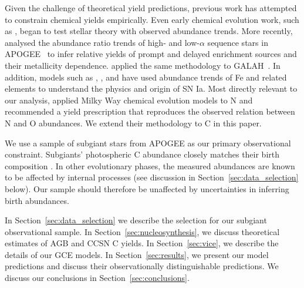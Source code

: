 \documentclass[fleqn,
usenatbib]{mnras}
\begin{document}
Given the challenge of theoretical yield predictions, previous work has attempted to constrain chemical yields empirically. 
Even early chemical evolution work, such as \citet{garnett1997}, began to test stellar theory with observed abundance trends.
More recently, \citet{weinberg+19, weinberg+22} analysed the abundance ratio trends of high- and low-$\alpha$ sequence stars in APOGEE~\citep{apogee17} to infer relative yields of prompt and delayed enrichment sources and their metallicity dependence.
\citet{emily+19, emily+22, emily+24} applied the same methodology to GALAH~\citep{DeSilva2015, Martell2017}. In addition, models such as \citet{maoz+graur2017}, \citet{eitner+2020}, and \citet{dubay+24} have used abundance trends of Fe and related elements to understand the physics and origin of SN Ia.
Most directly relevant to our analysis, \citet{james+24} applied Milky Way chemical evolution models to N and recommended a yield prescription that reproduces the observed relation between N and O abundances. We  extend their methodology to C in this paper.




We use a sample of subgiant stars from APOGEE \citep{apogee17} as our primary observational constraint.
Subgiants' photospheric C abundance closely matches their birth composition \citep{gilroy89, korn+07, lind+08, souto+18, souto19}.
In other evolutionary phases, the measured abundances are known to be affected by internal processes (see discussion in Section~\ref{sec:data_selection} below).
Our sample should therefore be unaffected by uncertainties in inferring birth abundances.


In Section~\ref{sec:data_selection} we describe the selection for our subgiant observational sample.
In Section~\ref{sec:nucleosynthesis}, we discuss theoretical estimates of AGB and CCSN C yields.
In Section~\ref{sec:vice}, we describe the details of our GCE models.
In Section~\ref{sec:results}, we present our model predictions and discuss their observationally distinguishable predictions. 
We discuss our conclusions in Section~\ref{sec:conclusions}. 
\end{document}

